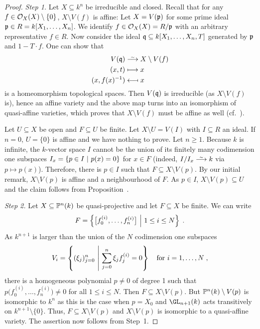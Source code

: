 \documentclass[a4paper,parskip=half,numbers=enddot, DIV=12]{scrreprt}
\begin{document}
\begin{proof}
	\emph{Step 1.} Let $X\subseteq k^n$ be irreducible and closed. Recall that for any $f\in \mathcal{O}_X(X)\setminus\{0\}$, $X\setminus V(f)$ is affine: Let $X=V(\mathfrak{p})$ for some prime ideal $\mathfrak{p}\in R=k[X_1,\ldots,X_n]$. We identify $f\in \mathcal{O}_X(X)=R/\mathfrak{p}$ with an arbitrary representative $f\in R$. Now consider the ideal $\mathfrak{q}\subseteq k[X_1,\ldots,X_n,T]$ generated by $\mathfrak{p}$ and $1-T\cdot f$. One can show that
	\begin{align*}
		V(\qq) &\isomorphism X\setminus V(f)\\
		(x,t) &\longmapsto x \\
		(x,f(x)^{-1}) &\longmapsfrom x
	\end{align*}
	is a homeomorphism topological spaces. Then $V(\mathfrak{q})$ is irreducible (as $X\setminus V(f)$ is), hence an affine variety and the above map turns into an isomorphism of quasi-affine varieties, which proves that $X\setminus V(f)$ must be affine as well (cf.\ \cite[Proposition~2.2.4]{alg1}).
	
	Let $U\subseteq X$ be open and $F\subseteq U$ be finite. Let $X\setminus U = V(I)$ with $I\subseteq R$ an ideal. If $n=0$, $U = \{0\}$ is affine and we have nothing to prove. Let $n\geq 1$. Because $k$ is infinite, the $k$-vector space $I$ cannot be the union of its finitely many codimension one subspaces $I_x=\left\{p\in I\ \middle|\  p(x) = 0\right\}$ for $x\in F$ (indeed, $I/I_x\isomorphism k$ via $p\mapsto p(x)$). Therefore, there is $p\in I$ such that $F\subseteq X\setminus V(p)$. By our initial remark, $X\setminus V(p)$ is affine and a neighbourhood of $F$. As $p\in I$, $X\setminus V(p)\subseteq U$ and the claim follows from Proposition~.
	
	\emph{Step 2.} Let $X\subseteq \mathbb{P}^n(k)$ be quasi-projective and let $F\subseteq X$ be finite. We can write 
	\begin{align*}
		F=\left\{\big[f_0^{(i)},\ldots, f_n^{(i)}\big]\ \middle|\  1\leq i \leq N\right\}\;.
	\end{align*} 
	As $k^{n+1}$ is larger than the union of the $N$ codimension one subspaces \begin{align*}
		V_i=\left\{(\xi_j)_{j=0}^n\ \middle|\  \sum_{j=0}^n \xi_j f_j^{(i)} = 0\right\}\quad\text{for }i=1,\ldots,N\;,
	\end{align*} 
	there is a homogeneous polynomial $p\neq 0$ of degree 1 such that $p\big(f_0^{(i)},\ldots, f_n^{(i)}\big) \neq 0$ for all $1\leq i\leq N$. Then $F\subseteq X\setminus V(p)$. But $\mathbb{P}^n(k)\setminus V(p)$ is isomorphic to $k^n$ as this is the case when $p= X_0$ and $\GL_{n+1}(k)$ acts transitively on $k^{n+1}\setminus\{0\}$. Thus, $F\subseteq X\setminus V(p)$ and $X\setminus V(p)$ is isomorphic to a quasi-affine variety. The assertion now follows from Step~1.
\end{proof}
\end{document}
